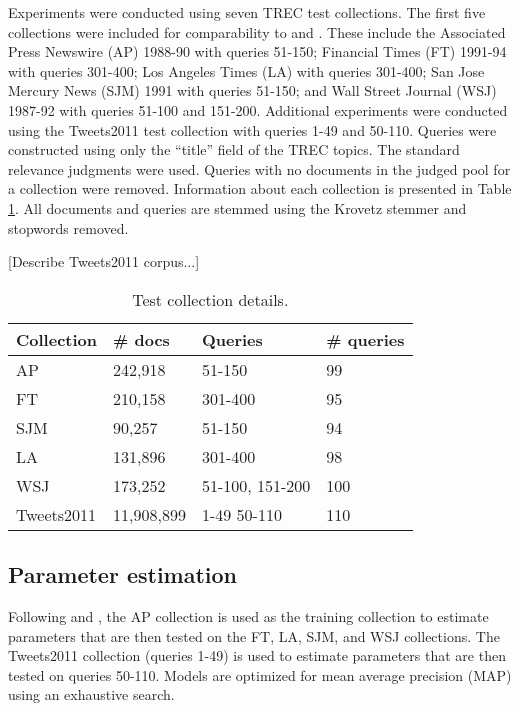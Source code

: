 \documentclass{sig-alternate}
\begin{document}
Experiments were conducted using seven TREC test collections. The first five collections were included for comparability to \cite{Liu2004} and \cite{Wei2006}. 
These include the Associated Press Newswire (AP) 1988-90 with queries 51-150; Financial Times (FT) 1991-94 with queries 301-400; 
Los Angeles Times (LA) with queries 301-400; San Jose Mercury News (SJM) 1991 with queries 51-150; 
and Wall Street Journal (WSJ) 1987-92 with queries 51-100 and 151-200. 
Additional experiments were conducted using the Tweets2011 test collection with queries 1-49 and 50-110.  
Queries were constructed using only the ``title'' field of the TREC topics. The standard relevance judgments were used. 
Queries with no documents in the judged pool for a collection were removed.  Information about each collection is presented in Table \ref{table.details}. 
All documents and queries are stemmed using the Krovetz \cite{} stemmer and stopwords removed.

 [Describe Tweets2011 corpus...] 

\begin{table}[htdp]
\small
\caption{Test collection details.  }
\begin{center}
\tabcolsep=0.11cm
\begin{tabular}{| l | l | l | l | }
\hline
\bf{Collection} & \bf{\# docs}  & \bf{Queries} & \bf{\# queries} \\ \hline
AP & 242,918 & 51-150 & 99 \\ \hline
FT & 210,158 & 301-400 & 95 \\ \hline
SJM & 90,257 & 51-150 & 94 \\ \hline
LA & 131,896 & 301-400 & 98 \\ \hline
WSJ & 173,252 & 51-100, 151-200 & 100 \\ \hline
Tweets2011 & 11,908,899 & 1-49  50-110  & 110\\ \hline
\end{tabular}
\end{center}
\label{table.details}
\normalsize
\end{table}

\subsection{Parameter estimation}

Following \cite{Liu2004} and \cite{Wei2006}, the AP collection is used as the training collection to estimate parameters that are then tested on the FT, LA, SJM, and WSJ collections. 
The Tweets2011 collection (queries 1-49) is used to estimate parameters that are then tested on queries 50-110. Models are optimized for mean average precision (MAP) using an exhaustive search.
\end{document}
